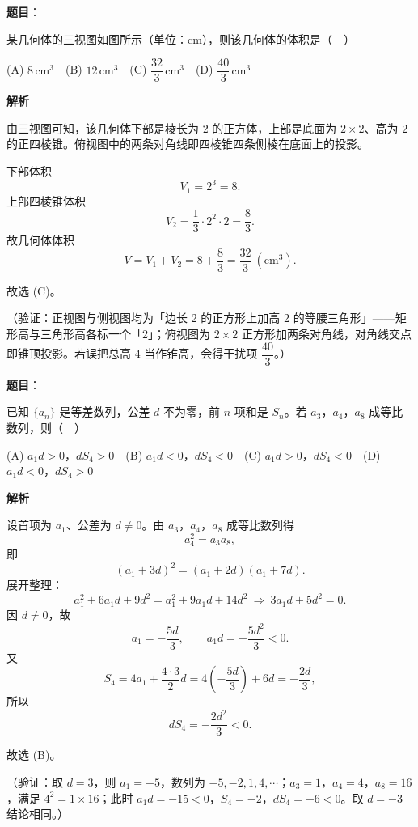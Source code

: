 \begin{answer}

\textbf{题目}：

某几何体的三视图如图所示（单位：\(\mathrm{cm}\)），则该几何体的体积是（　）
\nopagebreak[4]
\begin{center}\end{center}
\nopagebreak[4]
(A) \(8\,\mathrm{cm}^3\)　(B) \(12\,\mathrm{cm}^3\)　(C) \(\dfrac{32}{3}\,\mathrm{cm}^3\)　(D) \(\dfrac{40}{3}\,\mathrm{cm}^3\)

\textbf{解析}

由三视图可知，该几何体下部是棱长为 \(2\) 的正方体，上部是底面为 \(2\times2\)、高为 \(2\) 的正四棱锥。俯视图中的两条对角线即四棱锥四条侧棱在底面上的投影。

下部体积
\nopagebreak[4]
\[
V_1=2^3=8.
\]
上部四棱锥体积
\nopagebreak[4]
\[
V_2=\frac13\cdot2^2\cdot2=\frac83.
\]
故几何体体积
\nopagebreak[4]
\[
V=V_1+V_2=8+\frac83=\frac{32}{3}\ \left(\mathrm{cm}^3\right).
\]

故选 (C)。

（验证：正视图与侧视图均为「边长 2 的正方形上加高 2 的等腰三角形」——矩形高与三角形高各标一个「2」；俯视图为 \(2\times2\) 正方形加两条对角线，对角线交点即锥顶投影。若误把总高 \(4\) 当作锥高，会得干扰项 \(\dfrac{40}{3}\)。）


\end{answer}
\begin{answer}

\textbf{题目}：

已知 \(\{a_n\}\) 是等差数列，公差 \(d\) 不为零，前 \(n\) 项和是 \(S_n\)。若 \(a_3\)，\(a_4\)，\(a_8\) 成等比数列，则（　）

(A) \(a_1d>0\)，\(dS_4>0\)　(B) \(a_1d<0\)，\(dS_4<0\)　(C) \(a_1d>0\)，\(dS_4<0\)　(D) \(a_1d<0\)，\(dS_4>0\)

\textbf{解析}

设首项为 \(a_1\)、公差为 \(d\neq0\)。由 \(a_3\)，\(a_4\)，\(a_8\) 成等比数列得
\nopagebreak[4]
\[
a_4^2=a_3a_8,
\]
即
\nopagebreak[4]
\[
(a_1+3d)^2=(a_1+2d)(a_1+7d).
\]
展开整理：
\nopagebreak[4]
\[
a_1^2+6a_1d+9d^2=a_1^2+9a_1d+14d^2
\ \Longrightarrow\ 3a_1d+5d^2=0.
\]
因 \(d\neq0\)，故
\nopagebreak[4]
\[
a_1=-\frac{5d}{3},\qquad a_1d=-\frac{5d^2}{3}<0.
\]
又
\nopagebreak[4]
\[
S_4=4a_1+\frac{4\cdot3}{2}d=4\left(-\frac{5d}{3}\right)+6d=-\frac{2d}{3},
\]
所以
\nopagebreak[4]
\[
dS_4=-\frac{2d^2}{3}<0.
\]

故选 (B)。

（验证：取 \(d=3\)，则 \(a_1=-5\)，数列为 \(-5,-2,1,4,\cdots\)；\(a_3=1\)，\(a_4=4\)，\(a_8=16\)，满足 \(4^2=1\times16\)；此时 \(a_1d=-15<0\)，\(S_4=-2\)，\(dS_4=-6<0\)。取 \(d=-3\) 结论相同。）


\end{answer}
